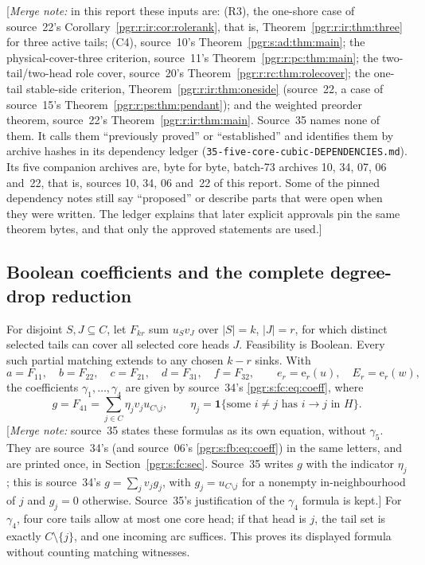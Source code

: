 \documentclass[11pt]{article}
\numberwithin{equation}{section}
\theoremstyle{definition}\newtheorem{definition}[theorem]{Definition}\newtheorem{remark}[theorem]{Remark}
\newcommand{\ee}{\mathrm e}                %
\newcommand{\mnote}[1]{[\textit{Merge note:} #1]}
\begin{document}
\mnote{in this report these inputs are: (R3), the one-shore case of
source~22's Corollary~\ref{pgr:r:ir:cor:rolerank}, that is,
Theorem~\ref{pgr:r:ir:thm:three} for three active tails; (C4), source~10's
Theorem~\ref{pgr:s:ad:thm:main}; the physical-cover-three criterion,
source~11's Theorem~\ref{pgr:r:pc:thm:main}; the two-tail/two-head role
cover, source~20's Theorem~\ref{pgr:r:rc:thm:rolecover}; the one-tail
stable-side criterion, Theorem~\ref{pgr:r:ir:thm:oneside} (source~22, a
case of source~15's Theorem~\ref{pgr:r:ps:thm:pendant}); and the weighted
preorder theorem, source~22's Theorem~\ref{pgr:r:ir:thm:main}. Source~35
names none of them. It calls them ``previously proved'' or ``established''
and identifies them by archive hashes in its dependency ledger
(\nolinkurl{35-five-core-cubic-DEPENDENCIES.md}). Its five companion
archives are, byte for byte, batch-73 archives 10, 34, 07, 06 and~22, that
is, sources 10, 34, 06 and~22 of this report. Some of the pinned dependency
notes still say ``proposed'' or describe parts that were open when they
were written. The ledger explains that later explicit approvals pin the
same theorem bytes, and that only the approved statements are used.}

\subsection{Boolean coefficients and the complete degree-drop reduction}
For disjoint $S,J\subseteq C$, let $F_{kr}$ sum $u_Sv_J$ over $|S|=k$, $|J|=r$, for which distinct selected tails can cover all selected core heads $J$. Feasibility is Boolean. Every such partial matching extends to any chosen $k-r$ sinks. With
\[
 a=F_{11},\quad b=F_{22},\quad c=F_{21},\quad d=F_{31},\quad f=F_{32},
 \qquad e_r=\ee_r(u),\quad E_r=\ee_r(w),
\]
the coefficients $\gamma_1,\dots,\gamma_4$ are given by source~34's
\eqref{pgr:s:fc:eq:coeff}, where
\[
 g=F_{41}=\sum_{j\in C}\eta_jv_ju_{C\setminus j},
 \qquad \eta_j=\mathbf1\{\text{some }i\ne j\text{ has }i\to j\text{ in }H\}.
\]
\mnote{source~35 states these formulas as its own equation, without
$\gamma_5$. They are source~34's (and source~06's
\eqref{pgr:s:fb:eq:coeff}) in the same letters, and are printed once, in
Section~\ref{pgr:s:fc:sec}. Source~35 writes $g$ with the indicator
$\eta_j$; this is source~34's $g=\sum_jv_jg_j$, with $g_j=u_{C\setminus j}$
for a nonempty in-neighbourhood of $j$ and $g_j=0$ otherwise. Source~35's
justification of the $\gamma_4$ formula is kept.}
For $\gamma_4$, four core tails allow at most one core head; if that head is $j$, the tail set is exactly $C\setminus\{j\}$, and one incoming arc suffices. This proves its displayed formula without counting matching witnesses.
\end{document}
